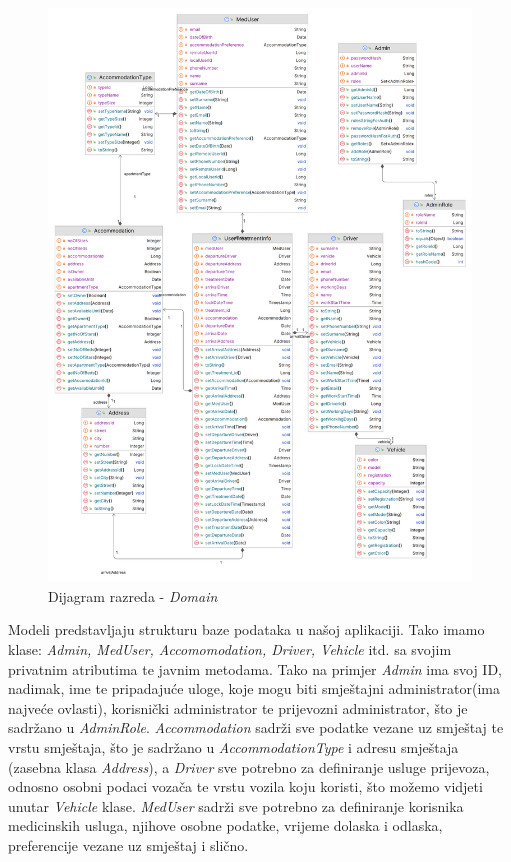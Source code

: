 			\begin{figure}[H]
				\includegraphics[width=\textwidth]{slike/domain.PNG}
				\caption{Dijagram razreda - \textit{Domain}}
				\label{domainDiagram}
			\end{figure}
			
			{Modeli predstavljaju strukturu baze podataka u našoj aplikaciji. Tako imamo klase: \textit{Admin, MedUser, Accomomodation, Driver, Vehicle} itd. sa svojim privatnim atributima te javnim metodama. Tako na primjer \textit{Admin} ima svoj ID, nadimak, ime te pripadajuće uloge, koje mogu biti smještajni administrator(ima najveće ovlasti), korisnički administrator te prijevozni administrator, što je sadržano u \textit{AdminRole}. \textit{Accommodation} sadrži sve podatke vezane uz smještaj te vrstu smještaja, što je sadržano u \textit{AccommodationType} i adresu smještaja (zasebna klasa \textit{Address}), a \textit{Driver} sve potrebno za definiranje usluge prijevoza, odnosno osobni podaci vozača te vrstu vozila koju koristi, što možemo vidjeti unutar \textit{Vehicle} klase. \textit{MedUser} sadrži sve potrebno za definiranje korisnika medicinskih usluga, njihove osobne podatke, vrijeme dolaska i odlaska, preferencije vezane uz smještaj i slično. }\\
		
